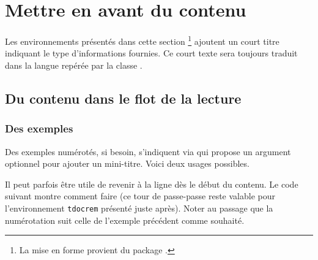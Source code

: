 
\section{Mettre en avant du contenu}

\begin{tdocnote}
    Les environnements présentés dans cette section
    \footnote{
        La mise en forme provient du package .
    }
    ajoutent un court titre indiquant le type d'informations fournies.
    Ce court texte sera toujours traduit dans la langue repérée par la classe \thisproj.
\end{tdocnote}



\subsection{Du contenu dans le flot de la lecture}




\subsubsection{Des exemples}

Des exemples numérotés, si besoin, s'indiquent via  qui propose un argument optionnel pour ajouter un mini-titre.
Voici deux usages possibles.




\begin{tdoctip}
    Il peut parfois être utile de revenir à la ligne dès le début du contenu. Le code suivant montre comment faire (ce tour de passe-passe reste valable pour l'environnement \verb#tdocrem# présenté juste après). Noter au passage que la numérotation suit celle de l'exemple précédent comme souhaité.
\end{tdoctip}

